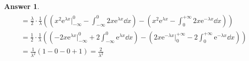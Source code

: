 \documentclass[utf8]{article}
\theoremstyle{definition}%
\theoremstyle{plain}%
\newtheorem{answer}{Answer} %
\begin{document}
\begin{answer}
\begin{align}
\begin{aligned}
        &= \frac{\lambda}{2}\cdot\frac{1}{\lambda} \left(\left(x^2\mathrm{e}^{\lambda x}\Big|_{-\infty}^{0} - \int_{-\infty}^{0}2x\mathrm{e}^{\lambda x}\dd{x}\right) - \left(x^2\mathrm{e}^{\lambda x} - \int_{0}^{+\infty}2x\mathrm{e}^{-\lambda x}\dd{x}\right)\right) \\
        &= \frac{1}{2} \cdot \frac{1}{\lambda} \left(\left(-2x\mathrm{e}^{\lambda x}\Big|_{-\infty}^{0} + 2\int_{-\infty}^{0}\mathrm{e}^{\lambda x}\dd{x}\right) - \left(2x\mathrm{e}^{-\lambda x}\Big|_{0}^{+\infty} - 2\int_{0}^{+\infty}\mathrm{e}^{-\lambda x}\dd{x}\right)\right) \\
        &= \frac{1}{\lambda^2} \left(1 - 0 - 0 + 1\right) = \frac{2}{\lambda^2}
    \end{aligned}
    \end{align}
\end{answer}
\end{document}
